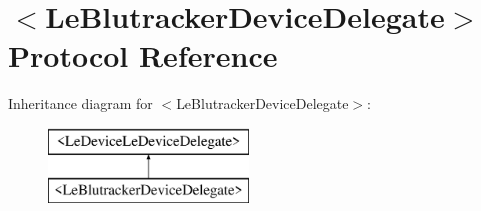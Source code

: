 \hypertarget{protocol_le_blutracker_device_delegate-p}{}\section{$<$Le\+Blutracker\+Device\+Delegate$>$ Protocol Reference}
\label{protocol_le_blutracker_device_delegate-p}
Inheritance diagram for $<$Le\+Blutracker\+Device\+Delegate$>$\+:\begin{figure}[H]
\begin{center}
\leavevmode
\includegraphics[height=2.000000cm]{protocol_le_blutracker_device_delegate-p}
\end{center}
\end{figure}
